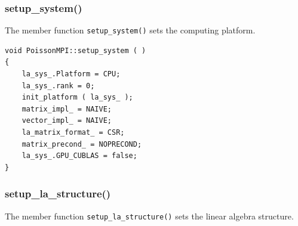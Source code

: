 \documentclass{article}
\begin{document}
\subsubsection{setup\_system()}

The member function \texttt{setup\_system()} sets the computing platform.

\begin{lstlisting}
void PoissonMPI::setup_system ( )
{
    la_sys_.Platform = CPU;
    la_sys_.rank = 0;
    init_platform ( la_sys_ );
    matrix_impl_ = NAIVE;
    vector_impl_ = NAIVE;
    la_matrix_format_ = CSR;
    matrix_precond_ = NOPRECOND;
    la_sys_.GPU_CUBLAS = false;
}
\end{lstlisting}

\subsubsection{setup\_la\_structure()}

The member function \texttt{setup\_la\_structure()} sets the linear algebra structure.
 
\end{document}
